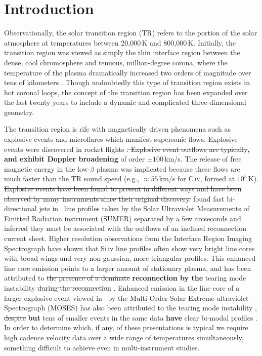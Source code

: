 

\section{Introduction}

    Observationally, the solar transition region (TR) refers to the portion of the solar atmosphere at temperatures between 20,000\,K and 800,000\,K. 
    Initially, the transition region was viewed as simply the thin interface region between the dense, cool chromosphere and tenuous, million-degree corona, where the temperature of the plasma dramatically increased two orders of magnitude over tens of kilometers \citep[see][and references therein]{tian2017}. 
    Though undoubtedly this type of transition region exists in hot coronal loops, the concept of the transition region has been expanded over the last twenty years to include a dynamic and complicated three-dimensional geometry. 
    
    The transition region is rife with magnetically driven phenomena such as explosive events \cite[e.g.,][]{dere1991} and microflares \citep{gontikakis2012} which manifest supersonic flows.
    Explosive events were discovered in rocket flights \citep{Dere1989}\sout{. 
    Explosive event outflows are typically}\textbf{, and exhibit Doppler broadening} of order $\pm 100$\,km/s. 
    The release of free magnetic energy in the low-$\beta$ plasma was implicated because these flows are much faster than the TR sound speed (e.g., $\approx55$\,km/s  for C\,\textsc{iv}, formed at $10^5$\,K).
    \sout{Explosive events have been found to present in different ways and have been observed by many instruments since their original discovery.}
    \citet{innes1997} found fast bi-directional jets in \siiv \ line profiles taken by the Solar Ultraviolet Measurements of Emitted Radiation instrument (SUMER)  \citep{SUMER} separated by a few arcseconds and inferred they must be associated with the outflows of an inclined reconnection current sheet.
    Higher resolution observations from the Interface Region Imaging Spectrograph \citep[IRIS]{depontieu2014} have shown that Si\,{\sc iv} line profiles often show very bright line cores with broad wings and very non-gaussian, more triangular profiles.
    This enhanced line core emission points to a larger amount of stationary plasma, and has been attributed to \sout{the presence of a dominate} \textbf{reconnection by the} tearing mode instability \sout{during the reconnection} \citep{Innes2015}.
    Enhanced emission in the line core of a larger explosive event viewed in \heii \ by the Multi-Order Solar Extreme-ultraviolet Spectrograph (MOSES)  has also been attributed to the tearing mode instability \citep{Fox2010}, \sout{despite} \textbf{but} tens of smaller events in the same data \textbf{have} clear bi-modal profiles \citep{Rust2019}.
    In order to determine which, if any, of these presentations is typical we require high cadence velocity data over a wide range of temperatures simultaneously, something difficult to achieve even in multi-instrument studies.
    
